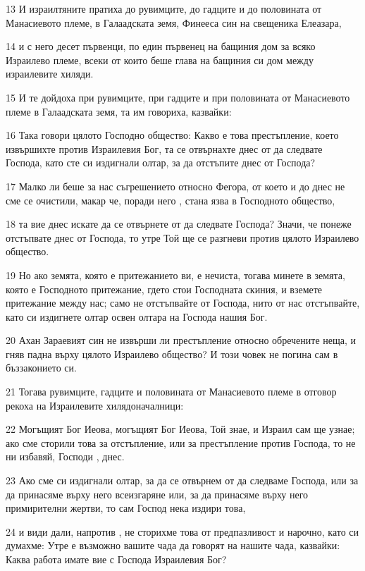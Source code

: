 \par 13 И израилтяните пратиха до рувимците, до гадците и до половината от Манасиевото племе, в Галаадската земя, Финееса син на свещеника Елеазара,
\par 14 и с него десет първенци, по един първенец на бащиния дом за всяко Израилево племе, всеки от които беше глава на бащиния си дом между израилевите хиляди.
\par 15 И те дойдоха при рувимците, при гадците и при половината от Манасиевото племе в Галаадската земя, та им говориха, казвайки:
\par 16 Така говори цялото Господно общество: Какво е това престъпление, което извършихте против Израилевия Бог, та се отвърнахте днес от да следвате Господа, като сте си издигнали олтар, за да отстъпите днес от Господа?
\par 17 Малко ли беше за нас съгрешението относно Фегора, от което и до днес не сме се очистили, макар че, поради него , стана язва в Господното общество,
\par 18 та вие днес искате да се отвърнете от да следвате Господа? Значи, че понеже отстъпвате днес от Господа, то утре Той ще се разгневи против цялото Израилево общество.
\par 19 Но ако земята, която е притежанието ви, е нечиста, тогава минете в земята, която е Господното притежание, гдето стои Господната скиния, и вземете притежание между нас; само не отстъпвайте от Господа, нито от нас отстъпвайте, като си издигнете олтар освен олтара на Господа нашия Бог.
\par 20 Ахан Зараевият син не извърши ли престъпление относно обречените неща, и гняв падна върху цялото Израилево общество? И този човек не погина сам в бъззаконието си.
\par 21 Тогава рувимците, гадците и половината от Манасиевото племе в отговор рекоха на Израилевите хилядоначалници:
\par 22 Могъщият Бог Иеова, могъщият Бог Иеова, Той знае, и Израил сам ще узнае; ако сме сторили това за отстъпление, или за престъпление против Господа, то не ни избавяй, Господи , днес.
\par 23 Ако сме си издигнали олтар, за да се отвърнем от да следваме Господа, или за да принасяме върху него всеизгаряне или, за да принасяме върху него примирителни жертви, то сам Господ нека издири това,
\par 24 и види дали, напротив , не сторихме това от предпазливост и нарочно, като си думахме: Утре е възможно вашите чада да говорят на нашите чада, казвайки: Каква работа имате вие с Господа Израилевия Бог?
